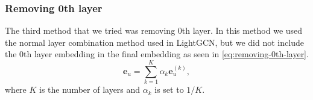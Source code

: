 \subsubsection{Removing 0th layer}
The third method that we tried was removing 0th layer.
In this method we used the normal layer combination method used in LightGCN, but we did not include the 0th layer embedding in the final embedding as seen in \autoref{eq:removing-0th-layer}.
\begin{equation}
	\mathbf{e}_u = \sum_{k=1}^{K} \alpha_k \mathbf{e}_u^{(k)},
	\label{eq:removing-0th-layer}
\end{equation}
where $K$ is the number of layers and $\alpha_k$ is set to $1/K$.
